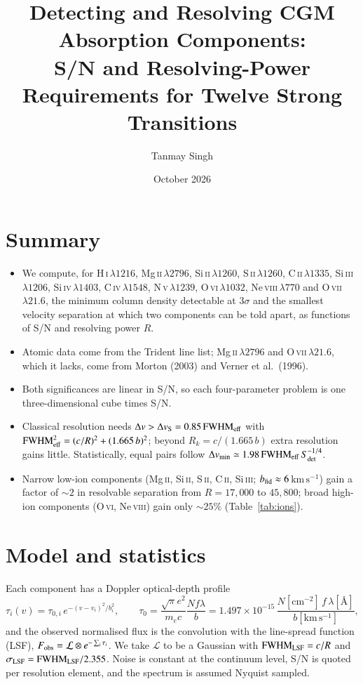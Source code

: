 \documentclass[10pt]{article}
\title{\vspace{-1.5em}Detecting and Resolving CGM Absorption Components:\\
S/N and Resolving-Power Requirements for Twelve Strong Transitions}
\author{Tanmay Singh}
\date{October 2026}
\newcommand{\kms}{\ensuremath{\mathrm{km\,s^{-1}}}}
\newcommand{\OVI}{O\,\textsc{vi}}
\newcommand{\fwhm}{\ensuremath{\mathrm{FWHM}}}
\newcommand{\Sdet}{\ensuremath{S_{\rm det}}}
\begin{document}
\maketitle
\vspace{-1em}

\section*{Summary}
\begin{itemize}
\item We compute, for H\,\textsc{i}\,$\lambda1216$, Mg\,\textsc{ii}\,$\lambda2796$, Si\,\textsc{ii}\,$\lambda1260$, S\,\textsc{ii}\,$\lambda1260$, C\,\textsc{ii}\,$\lambda1335$, Si\,\textsc{iii}\,$\lambda1206$, Si\,\textsc{iv}\,$\lambda1403$, C\,\textsc{iv}\,$\lambda1548$, N\,\textsc{v}\,$\lambda1239$, \OVI\,$\lambda1032$, Ne\,\textsc{viii}\,$\lambda770$ and O\,\textsc{vii}\,$\lambda21.6$, the minimum column density detectable at 3$\sigma$ and the smallest velocity separation at which two components can be told apart, as functions of S/N and resolving power $R$.
\item Atomic data come from the Trident line list; Mg\,\textsc{ii}\,$\lambda2796$ and O\,\textsc{vii}\,$\lambda21.6$, which it lacks, come from Morton (2003) and Verner et al.\ (1996).
\item Both significances are linear in S/N, so each four-parameter problem is one three-dimensional cube times S/N.
\item Classical resolution needs $\Delta v>\Delta v_{\rm S}=0.85\,\fwhm_{\rm eff}$ with $\fwhm_{\rm eff}^2=(c/R)^2+(1.665\,b)^2$; beyond $R_k=c/(1.665\,b)$ extra resolution gains little. Statistically, equal pairs follow $\Delta v_{\rm min}\simeq1.98\,\fwhm_{\rm eff}\,\Sdet^{-1/4}$.
\item Narrow low-ion components (Mg\,\textsc{ii}, Si\,\textsc{ii}, S\,\textsc{ii}, C\,\textsc{ii}, Si\,\textsc{iii}; $b_{\rm fid}\approx6$\,\kms) gain a factor of $\sim2$ in resolvable separation from $R=17{,}000$ to $45{,}800$; broad high-ion components (\OVI, Ne\,\textsc{viii}) gain only $\sim25\%$ (Table~\ref{tab:ions}).
\end{itemize}

\section{Model and statistics}
Each component has a Doppler optical-depth profile
\begin{equation}
\tau_i(v)=\tau_{0,i}\,e^{-(v-v_i)^2/b_i^2},\qquad
\tau_{0}=\frac{\sqrt{\pi}e^2}{m_ec}\frac{Nf\lambda}{b}=1.497\times10^{-15}\,\frac{N[\mathrm{cm^{-2}}]\,f\,\lambda[\text{\AA}]}{b[\kms]},
\end{equation}
and the observed normalised flux is the convolution with the line-spread function (LSF), $F_{\rm obs}=\mathcal{L}\otimes e^{-\sum_i\tau_i}$. We take $\mathcal{L}$ to be a Gaussian with $\fwhm_{\rm LSF}=c/R$ and $\sigma_{\rm LSF}=\fwhm_{\rm LSF}/2.355$. Noise is constant at the continuum level, S/N is quoted per resolution element, and the spectrum is assumed Nyquist sampled.
\end{document}
